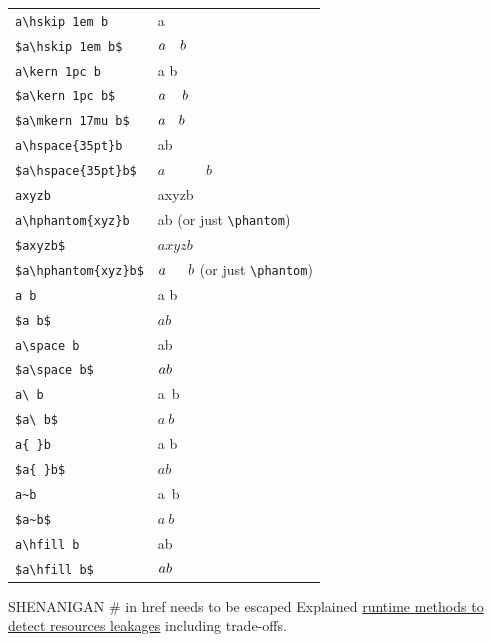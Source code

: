 \begin{tabular}{lp{5cm}}
  \verb|a\hskip 1em b|            & a\hskip 1em b \\
  \verb|$a\hskip 1em b$|          & $a\hskip 1em b$ \\
  \verb|a\kern 1pc b|             & a\kern 1pc b \\
  \verb|$a\kern 1pc b$|           & $a\kern 1pc b$ \\
  \verb|$a\mkern 17mu b$|         & $a\mkern 17mu b$ \\
  \verb|a\hspace{35pt}b|          & a\hspace{35pt}b \\
  \verb|$a\hspace{35pt}b$|        & $a\hspace{35pt}b$ \\
  \verb|axyzb|                    & axyzb \\
  \verb|a\hphantom{xyz}b|         & a\hphantom{xyz}b (or just \verb|\phantom|) \\
  \verb|$axyzb$|                  & $axyzb$ \\
  \verb|$a\hphantom{xyz}b$|       & $a\hphantom{xyz}b$ (or just \verb|\phantom|) \\
  \verb|a b|                      & a b \\
  \verb|$a b$|                    & $a b$ \\
  \verb|a\space b|                & a\space b \\
  \verb|$a\space b$|              & $a\space b$ \\
  \verb|a\ b|                     & a\ b \\
  \verb|$a\ b$|                   & $a\ b$ \\
  \verb|a{ }b|                    & a{ }b \\
  \verb|$a{ }b$|                  & $a{ }b$ \\
  \verb|a~b|                      & a~b \\
  \verb|$a~b$|                    & $a~b$ \\
  \verb|a\hfill b|                & a\hfill b \\
  \verb|$a\hfill b$|              & $a\hfill b$
\end{tabular}

SHENANIGAN
# in href needs to be escaped
Explained \href{https://github.com/ziglang/zig/issues/6152\#issuecomment-1369286411}{\color{darkblue}runtime methods to detect resources leakages} including trade-offs.
